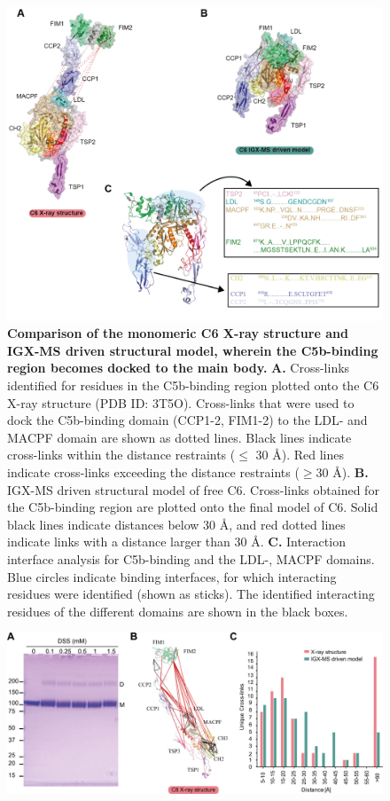 \begin{subappendices}
	\begin{figure}[hbt]
		\center
		\includegraphics[]{Chapter.2/Figures/SI_Figure6.png}
		\caption{\textbf{Comparison of the monomeric C6 X-ray structure and IGX-MS driven structural model, wherein the C5b-binding region becomes docked to the main body.} \textbf{A.} Cross-links identified for residues in the C5b-binding region plotted onto the C6 X-ray structure (PDB ID: 3T5O). Cross-links that were used to dock the C5b-binding domain (CCP1-2, FIM1-2) to the LDL- and MACPF domain are shown as dotted lines. Black lines indicate cross-links within the distance restraints ($\leq$ 30 Å). Red lines indicate cross-links exceeding the distance restraints ($\geq$30 Å). \textbf{B.} IGX-MS driven structural model of free C6. Cross-links obtained for the C5b-binding region are plotted onto the final model of C6. Solid black lines indicate distances below 30 Å, and red dotted lines indicate links with a distance larger than 30 Å. \textbf{C.} Interaction interface analysis for C5b-binding and the LDL-, MACPF domains. Blue circles indicate binding interfaces, for which interacting residues were identified (shown as sticks). The identified interacting residues of the different domains are shown in the black boxes.}
		\label{fig:ch2_app_fig8}
	\end{figure}
	\begin{figure}[hbt]
		\center
		\includegraphics[]{Chapter.2/Figures/EV_Figure3.png}

\end{figure}
\end{subappendices}

